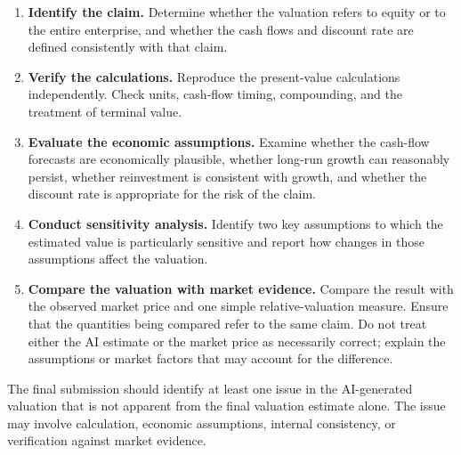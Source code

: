 \begin{enumerate}

\item \textbf{Identify the claim.}
Determine whether the valuation refers to equity or to the entire enterprise, and whether the cash flows and discount rate are defined consistently with that claim.

\item \textbf{Verify the calculations.}
Reproduce the present-value calculations independently. Check units, cash-flow timing, compounding, and the treatment of terminal value.

\item \textbf{Evaluate the economic assumptions.}
Examine whether the cash-flow forecasts are economically plausible, whether long-run growth can reasonably persist, whether reinvestment is consistent with growth, and whether the discount rate is appropriate for the risk of the claim.

\item \textbf{Conduct sensitivity analysis.}
Identify two key assumptions to which the estimated value is particularly sensitive and report how changes in those assumptions affect the valuation.

\item \textbf{Compare the valuation with market evidence.}
Compare the result with the observed market price and one simple relative-valuation measure. Ensure that the quantities being compared refer to the same claim. Do not treat either the AI estimate or the market price as necessarily correct; explain the assumptions or market factors that may account for the difference.

\end{enumerate}

The final submission should identify at least one issue in the AI-generated valuation that is not apparent from the final valuation estimate alone. The issue may involve calculation, economic assumptions, internal consistency, or verification against market evidence.



